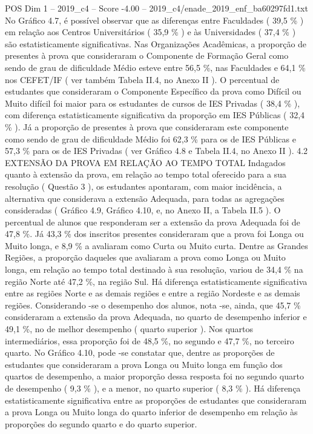 \begin{textsample}{POS Dim 1 – 2019\_c4 – Score -4.00 – 2019\_c4/enade\_2019\_enf\_ba60297fd1.txt}
No Gráfico 4.7, é possível observar que as diferenças entre Faculdades ( 39,5 \% ) em relação aos Centros Universitários ( 35,9 \% ) e às Universidades ( 37,4 \% ) são estatisticamente significativas.
Nas Organizações Acadêmicas, a proporção de presentes à prova que consideraram o Componente de Formação Geral como sendo de grau de dificuldade Médio esteve entre 56,5 \%, nas Faculdades e 64,1 \% nos CEFET/IF ( ver também Tabela II.4, no Anexo II ).
O percentual de estudantes que consideraram o Componente Específico da prova como Difícil ou Muito difícil foi maior para os estudantes de cursos de IES Privadas ( 38,4 \% ), com diferença estatisticamente significativa da proporção em IES Públicas ( 32,4 \% ).
Já a proporção de presentes à prova que consideraram este componente como sendo de grau de dificuldade Médio foi 62,3 \% para os de IES Públicas e 57,3 \% para os de IES Privadas ( ver Gráfico 4.8 e Tabela II.4, no Anexo II ). 4.2 EXTENSÃO DA PROVA EM RELAÇÃO AO TEMPO TOTAL Indagados quanto à extensão da prova, em relação ao tempo total oferecido para a sua resolução ( Questão 3 ), os estudantes apontaram, com maior incidência, a alternativa que considerava a extensão Adequada, para todas as agregações consideradas ( Gráfico 4.9, Gráfico 4.10, e, no Anexo II, a Tabela II.5 ).
O percentual de alunos que responderam ser a extensão da prova Adequada foi de 47,8 \%.
Já 43,3 \% dos inscritos presentes consideraram que a prova foi Longa ou Muito longa, e 8,9 \% a avaliaram como Curta ou Muito curta.
Dentre as Grandes Regiões, a proporção daqueles que avaliaram a prova como Longa ou Muito longa, em relação ao tempo total destinado à sua resolução, variou de 34,4 \% na região Norte até 47,2 \%, na região Sul.
Há diferença estatisticamente significativa entre as regiões Norte e as demais regiões e entre a região Nordeste e as demais regiões.
Considerando -se o desempenho dos alunos, nota -se, ainda, que 45,7 \% consideraram a extensão da prova Adequada, no quarto de desempenho inferior e 49,1 \%, no de melhor desempenho ( quarto superior ).
Nos quartos intermediários, essa proporção foi de 48,5 \%, no segundo e 47,7 \%, no terceiro quarto.
No Gráfico 4.10, pode -se constatar que, dentre as proporções de estudantes que consideraram a prova Longa ou Muito longa em função dos quartos de desempenho, a maior proporção dessa resposta foi no segundo quarto de desempenho ( 9,3 \% ), e a menor, no quarto superior ( 8,3 \% ).
Há diferença estatisticamente significativa entre as proporções de estudantes que consideraram a prova Longa ou Muito longa do quarto inferior de desempenho em relação às proporções do segundo quarto e do quarto superior.

\end{textsample}
